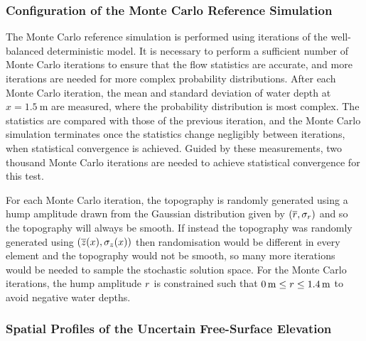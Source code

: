 \subsubsection{Configuration of the Monte Carlo Reference Simulation}
The Monte Carlo reference simulation is performed using iterations of the well-balanced deterministic model.
It is necessary to perform a sufficient number of Monte Carlo iterations to ensure that the flow statistics are accurate, and more iterations are needed for more complex probability distributions.
After each Monte Carlo iteration, the mean and standard deviation of water depth at $x = \SI{1.5}{\meter}$ are measured, where the probability distribution is most complex.
The statistics are compared with those of the previous iteration, and the Monte Carlo simulation terminates once the statistics change negligibly between iterations, when statistical convergence is achieved.
Guided by these measurements, two thousand Monte Carlo iterations are needed to achieve statistical convergence for this test.

For each Monte Carlo iteration, the topography is randomly generated using a hump amplitude drawn from the Gaussian distribution given by $(\overline{r}, \sigma_r)$ and so the topography will always be smooth.
If instead the topography was randomly generated using $(\overline{z}(x), \sigma_z(x))$ then randomisation would be different in every element and the topography would not be smooth, so many more iterations would be needed to sample the stochastic solution space.
For the Monte Carlo iterations, the hump amplitude $r$ is constrained such that $\SI{0}{\meter} \leq r \leq \SI{1.4}{\meter}$ to avoid negative water depths.

\subsubsection{Spatial Profiles of the Uncertain Free-Surface Elevation}

